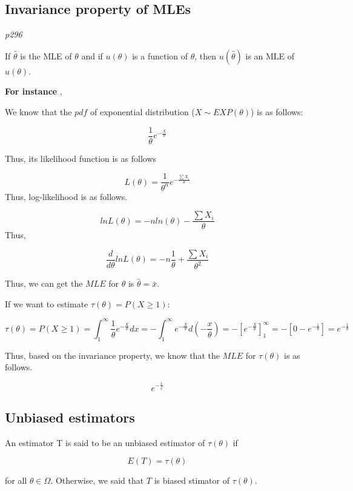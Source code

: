 \documentclass[
]{book}
\begin{document}
\hypertarget{invariance-property-of-mles}{%
\subsection{Invariance property of MLEs}\label{invariance-property-of-mles}}

\emph{p296}

If \(\hat{\theta}\) is the MLE of \(\theta\) and if \(u(\theta)\) is a function of \(\theta\), then \(u(\hat{\theta})\) is an MLE of \(u(\theta)\).

\textbf{For instance} ,

We know that the \(pdf\) of exponential distribution (\(X \sim EXP (\theta)\)) is as follows:

\[\frac{1}{\theta} e^{-\frac{X}{\theta}}\]

Thus, its likelihood function is as follows

\[L(\theta)=\frac{1}{\theta^n}e^{-\frac{\sum X_i}{\theta}}\]
Thus, log-likelihood is as follows.

\[lnL(\theta)=-n ln(\theta)-\frac{\sum X_i}{\theta}\]
Thus,

\[\frac{d}{d\theta} lnL(\theta)=-n \frac{1}{\theta}+\frac{\sum X_i}{\theta^2}\]

Thus, we can get the \(MLE\) for \(\theta\) is \(\hat{\theta}=\bar{x}\).

If we want to estimate \(\tau(\theta)=P(X \geq 1)\):

\[\tau(\theta)=P(X\geq 1)=\int_1^{\infty} \frac{1}{\theta} e^{-\frac{X}{\theta}} dx=-\int_1^{\infty}  e^{-\frac{X}{\theta}} d(-\frac{x}{\theta})=-[e^{-\frac{X}{\theta}}]_1^{\infty}=-[0-e^{-\frac{1}{\theta}}]=e^{-\frac{1}{\theta}}\]

Thus, based on the invariance property, we know that the \(MLE\) for \(\tau(\theta)\) is as follows.

\[e^{-\frac{1}{\bar{x}}}\]

\hypertarget{unbiased-estimators}{%
\subsection{Unbiased estimators}\label{unbiased-estimators}}

An estimator T is said to be an unbiased estimator of \(\tau(\theta)\) if

\[E(T)=\tau(\theta)\]

for all \(\theta \in \Omega\). Otherwise, we said that \(T\) is biased stimator of \(\tau(\theta)\).
\end{document}
